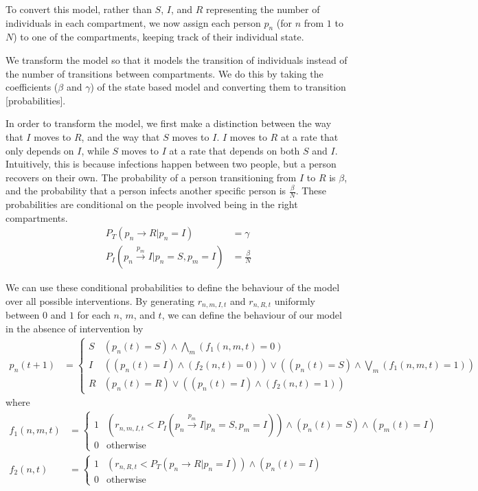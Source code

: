 \documentclass{article}
\begin{document}
To convert this model, rather than $S$, $I$, and $R$ representing the number of individuals in each compartment, we now assign each person $p_n$ (for $n$ from $1$ to $N$) to one of the compartments, keeping track of their individual state.

We transform the model so that it models the transition of individuals instead of the number of transitions between compartments.  We do this by taking the coefficients ($\beta$ and $\gamma$) of the state based model and converting them to transition [probabilities]. %

In order to transform the model, we first make a distinction between the way that $I$ moves to $R$, and the way that $S$ moves to $I$.  $I$ moves to $R$ at a rate that only depends on $I$, while $S$ moves to $I$ at a rate that depends on both $S$ and $I$.  Intuitively, this is because infections happen between two people, but a person recovers on their own.  The probability of a person transitioning from $I$ to $R$ is $\beta$, and the probability that a person infects another specific person is $\frac{\beta}{N}$.  These probabilities are conditional on the people involved being in the right compartments.
\begin{align*}
   P_T(p_n \rightarrow R \vert p_n = I) &= \gamma
\\ P_I(p_n \xrightarrow{p_m} I  \vert p_n = S, p_m = I) &= \frac{\beta}{N}
\end{align*}

We can use these conditional probabilities to define the behaviour of the model over all possible interventions.  By generating $r_{n,m,I,t}$ and $r_{n,R,t}$ uniformly between $0$ and $1$ for each $n$, $m$, and $t$, we can define the behaviour of our model in the absence of intervention by
\begin{align*}
p_n(t+1) &= \begin{cases}
     S & (p_n(t) = S) \wedge \bigwedge_m (f_1(n,m,t) = 0)
  \\ I & ((p_n(t) = I) \wedge (f_2(n,t) = 0)) \vee ((p_n(t) = S) \wedge \bigvee_m (f_1(n,m,t) = 1))
  \\ R & (p_n(t) = R) \vee ((p_n(t) = I) \wedge (f_2(n,t) = 1))
  \end{cases}
\end{align*}
where
\begin{align*}
   f_1(n,m,t) &= \begin{cases}
        1 & (r_{n,m,I,t} < P_I(p_n \xrightarrow{p_m} I  \vert p_n = S, p_m = I) ) \wedge (p_n(t) = S) \wedge (p_m(t) = I)
     \\ 0 & \text{otherwise}
   \end{cases}
\\ f_2(n,t) &= \begin{cases}
        1 & (r_{n,R,t} < P_T(p_n \rightarrow R  \vert p_n = I)) \wedge (p_n(t) = I)
     \\ 0 & \text{otherwise}
   \end{cases}
\end{align*}
\end{document}
